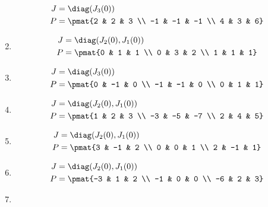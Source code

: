 \begin{enumerate}
\begin{align*}
J &= \diag(J_{3}(0))\\
P &= \pmat{2 & 2 & 3 \\ -1 & -1 & -1 \\ 4 & 3 & 6}
\end{align*}

\item

\begin{align*}
J &= \diag(J_{2}(0), J_{1}(0))\\
P &= \pmat{0 & 1 & 1 \\ 0 & 3 & 2 \\ 1 & 1 & 1}
\end{align*}

\item

\begin{align*}
J &= \diag(J_{3}(0))\\
P &= \pmat{0 & -1 & 0 \\ -1 & -1 & 0 \\ 0 & 1 & 1}
\end{align*}

\item

\begin{align*}
J &= \diag(J_{2}(0), J_{1}(0))\\
P &= \pmat{1 & 2 & 3 \\ -3 & -5 & -7 \\ 2 & 4 & 5}
\end{align*}

\item

\begin{align*}
J &= \diag(J_{2}(0), J_{1}(0))\\
P &= \pmat{3 & -1 & 2 \\ 0 & 0 & 1 \\ 2 & -1 & 1}
\end{align*}

\item

\begin{align*}
J &= \diag(J_{2}(0), J_{1}(0))\\
P &= \pmat{-3 & 1 & 2 \\ -1 & 0 & 0 \\ -6 & 2 & 3}
\end{align*}

\item


\end{enumerate}
